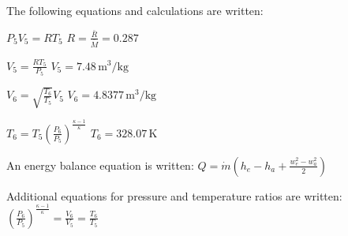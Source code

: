 The following equations and calculations are written:  

\( P_5 V_5 = R T_5 \)  
\( R = \frac{\bar{R}}{\bar{M}} = 0.287 \)  

\( V_5 = \frac{R T_5}{P_5} \)  
\( V_5 = 7.48 \, \text{m}^3/\text{kg} \)  

\( V_6 = \sqrt{\frac{T_6}{T_5}} V_5 \)  
\( V_6 = 4.8377 \, \text{m}^3/\text{kg} \)  

\( T_6 = T_5 \left(\frac{P_6}{P_5}\right)^{\frac{\kappa - 1}{\kappa}} \)  
\( T_6 = 328.07 \, \text{K} \)  

An energy balance equation is written:  
\( Q = \dot{m} (h_e - h_a + \frac{w_e^2 - w_a^2}{2}) \)  

Additional equations for pressure and temperature ratios are written:  
\( \left(\frac{P_6}{P_5}\right)^{\frac{\kappa - 1}{\kappa}} = \frac{V_6}{V_5} = \frac{T_6}{T_5} \)